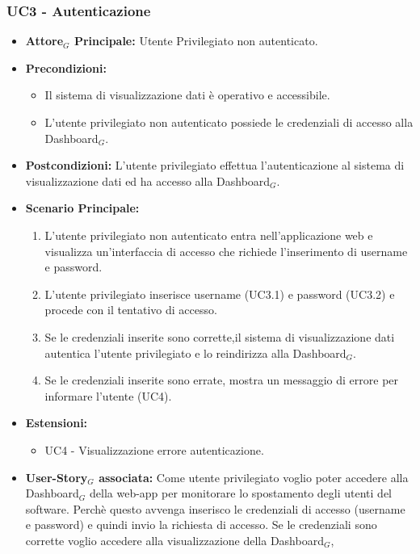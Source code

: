 \documentclass[11pt]{article}
\begin{document}
\begin{justify}
\subsubsection{\textbf{UC3 - Autenticazione}}
\begin{itemize}
     \item \textbf{Attore$_G$ Principale:} Utente Privilegiato non autenticato.
     \item \textbf{Precondizioni:}
        \begin{itemize}
            \item Il sistema di visualizzazione dati è operativo e accessibile.
            \item L'utente privilegiato non autenticato possiede le credenziali di accesso alla Dashboard$_G$.
        \end{itemize}
     \item \textbf{Postcondizioni:} L'utente privilegiato effettua l'autenticazione al sistema di visualizzazione dati ed ha accesso alla Dashboard$_G$.
     \item \textbf{Scenario Principale:}
        \begin{enumerate}
            \item L'utente privilegiato non autenticato entra nell'applicazione web e visualizza un'interfaccia di accesso che richiede l'inserimento di username e password.
            \item L'utente privilegiato inserisce username (UC3.1) e password (UC3.2) e procede con il tentativo di accesso.
            \item Se le credenziali inserite sono corrette,il sistema di visualizzazione dati autentica l’utente privilegiato e lo reindirizza alla Dashboard$_G$.
            \item Se le credenziali inserite sono errate, mostra un messaggio di errore per informare l’utente (UC4).
        \end{enumerate}
     \item \textbf{Estensioni:}
        \begin{itemize}
            \item UC4 - Visualizzazione errore autenticazione.
        \end{itemize}
     \item \textbf{User-Story$_G$ associata:}
     Come utente privilegiato voglio poter accedere alla Dashboard$_G$ della web-app per monitorare lo spostamento degli utenti del software. Perchè questo avvenga inserisco le credenziali di accesso (username e password) e quindi invio la richiesta di accesso. Se le credenziali sono corrette voglio accedere alla visualizzazione della Dashboard$_G$, 

\end{itemize}
\end{justify}
\end{document}
